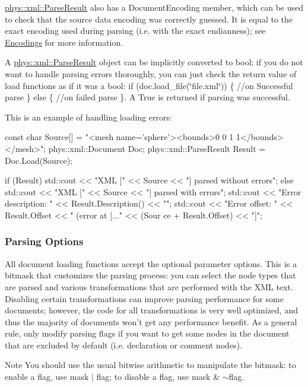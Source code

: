 \hyperlink{structphys_1_1xml_1_1ParseResult}{phys::xml::ParseResult} also has a DocumentEncoding member, which can be used to check that the source data encoding was correctly guessed. It is equal to the exact encoding used during parsing (i.e. with the exact endianness); see \hyperlink{XMLManual_XMLLoadingEncodings}{Encodings} for more information. \par
 \par
 A \hyperlink{structphys_1_1xml_1_1ParseResult}{phys::xml::ParseResult} object can be implicitly converted to bool; if you do not want to handle parsing errors thoroughly, you can just check the return value of load functions as if it was a bool: if (doc.load\_\-file(\char`\"{}file.xml\char`\"{})) \{ //on Successful parse \} else \{ //on failed parse \}. A True is returned if parsing was successful. \par
 \par
 This is an example of handling loading errors: 
\begin{DoxyCode}
 const char Source[] = "<mesh name='sphere'><bounds>0 0 1 1</bounds></mesh>";
 phys::xml::Document Doc;
 phys::xml::ParseResult Result = Doc.Load(Source);

 if (Result)
     std::cout << "XML [" << Source << "] parsed without errors\n\n";
 else
 {
     std::cout << "XML [" << Source << "] parsed with errors\n";
     std::cout << "Error description: " << Result.Description() << "\n";
     std::cout << "Error offset: " << Result.Offset << " (error at [..." << (Sour
      ce + Result.Offset) << "]\n\n";
 }
\end{DoxyCode}
 \hypertarget{XMLManual_XMLLoadingParsingOptions}{}\subsubsection{Parsing Options}\label{XMLManual_XMLLoadingParsingOptions}
All document loading functions accept the optional parameter options. This is a bitmask that customizes the parsing process: you can select the node types that are parsed and various transformations that are performed with the XML text. Disabling certain transformations can improve parsing performance for some documents; however, the code for all transformations is very well optimized, and thus the majority of documents won't get any performance benefit. As a general rule, only modify parsing flags if you want to get some nodes in the document that are excluded by default (i.e. declaration or comment nodes). \begin{DoxyNote}{Note}
You should use the usual bitwise arithmetic to manipulate the bitmask: to enable a flag, use mask $|$ flag; to disable a flag, use mask \& $\sim$flag.
\end{DoxyNote}
